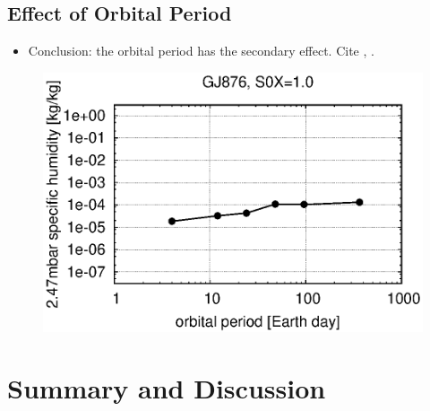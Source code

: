 \documentclass[11pt,numberedappendix,twocolappendix,]{emulateapj}
\begin{document}
\subsection{Effect of Orbital Period}
\label{ss:sensitivity_Porbit}

\begin{itemize}
\item Conclusion: the orbital period has the secondary effect. Cite \citet{Yang2013}, \citet{Kopparapu2016}. 
\end{itemize}

\begin{figure}[!h]
    \begin{center}
    \includegraphics[width=\hsize]{fig/AqOH0TLS_GJ876_q_sensitivity_changeP.eps}
    \end{center}
\caption{}                                                                                                             
\label{fig:changeP}
\end{figure}



\section{Summary and Discussion}
\label{s:summary}

\acknowledgments


\end{document}
